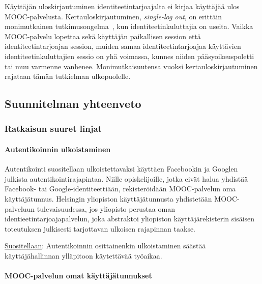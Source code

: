 \documentclass[finnish,gradu]{tktltiki}
\begin{document}
  Käyttäjän uloskirjautuminen identiteetintarjoajalta ei kirjaa käyttäjää ulos MOOC-palvelusta. Kertauloskirjautuminen, \emph{single-log out}, on erittäin monimutkainen tutkimusongelma~\cite{shibboleth_wiki_slo}, kun identiteetinkuluttajia on useita. Vaikka MOOC-palvelu lopettaa sekä käyttäjän paikallisen session että identiteetintarjoajan session, muiden samaa identiteetintarjoajaa käyttävien identiteetinkuluttajien sessio on yhä voimassa, kunnes niiden pääsyoikeuspoletti tai muu varmenne vanhenee. Monimutkaisuutensa vuoksi kertauloskirjautuminen rajataan tämän tutkielman ulkopuolelle.



  \subsection{Suunnitelman yhteenveto} %
  \label{sub:suunnitelman_arviointi}

  \subsubsection{Ratkaisun suuret linjat} %
  \label{ssub:ratkaisun_suuret_linjat}

  \paragraph{Autentikoinnin ulkoistaminen} \hfill  %
  \label{par:autentikoinnin_ulkoistaminen}

  Autentikointi suositellaan ulkoistettavaksi käyttäen Facebookin ja Googlen julkista autentikointirajapintaa. Niille opiskelijoille, jotka eivät halua yhdistää Facebook- tai Google-identiteettiään, rekisteröidään MOOC-palvelun oma käyttäjätunnus. Helsingin yliopiston käyttäjätunnusta yhdistetään MOOC-palveluun tulevaisuudessa, jos yliopisto perustaa oman identieetintarjoajapalvelun, joka abstraktoi yliopiston käyttäjärekisterin sisäisen toteutuksen julkisesti tarjottavan ulkoisen rajapinnan taakse.

  \underline{Suositellaan}: Autentikoinnin osittainenkin ulkoistaminen säästää käyttäjähallinnan ylläpitoon käytettävää työaikaa.

  \paragraph{MOOC-palvelun omat käyttäjätunnukset} \hfill %
  \label{par:mooc_palvelun_omat_käyttäjätunnukset}
\end{document}
